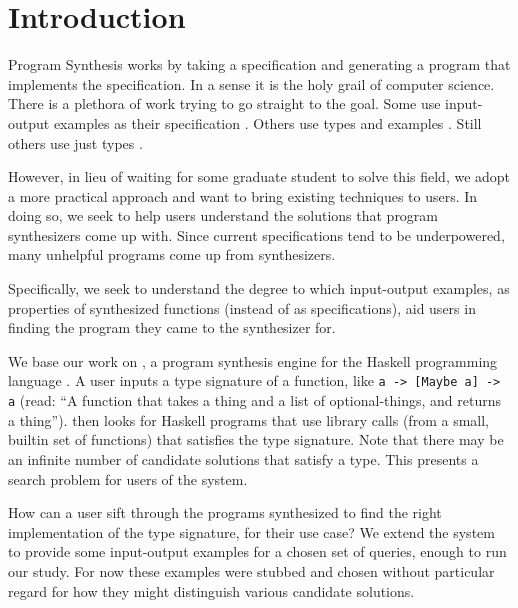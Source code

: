 \section{Introduction}

Program Synthesis works by taking a specification and generating a program that
implements the specification.
%
In a sense it is the holy grail of computer science.
%
There is a plethora of work trying to go straight to the goal.
%
Some use input-output examples as their specification
\cite{Feser_Chaudhuri_Dillig_2015}.
%
Others use types and examples \cite{Osera_Zdancewic_2015}.
%
Still others use just types \cite{hoogle_plus_2020}.

However, in lieu of waiting for some graduate student to solve this field, we
adopt a more practical approach and want to bring existing techniques to users.
%
In doing so, we seek to help users understand the solutions that program
synthesizers come up with.
%
Since current specifications tend to be underpowered, many unhelpful programs
come up from synthesizers.
%

Specifically, we seek to understand the degree to which input-output examples,
as properties of synthesized functions (instead of as specifications), aid users
in finding the program they came to the synthesizer for.


We base our work on \hoogleplus, a program synthesis engine for the
Haskell programming language \cite{hoogle_plus_2020}.
%
A user inputs a type signature of a function, like \texttt{a -> [Maybe a] -> a}
(read: ``A function that takes a thing and a list of optional-things, and
returns a thing'').
%
\hoogleplus then looks for Haskell programs that use library calls (from
a small, builtin set of functions) that satisfies the type signature.
%
Note that there may be an infinite number of candidate solutions that satisfy a type.
%
This presents a search problem for users of the system.

How can a user sift through the programs synthesized to find the right
implementation of the type signature, for their use case?
%
We extend the system to provide some input-output examples for a chosen set of
queries, enough to run our study.
%
For now these examples were stubbed and chosen without particular regard for how
they might distinguish various candidate solutions.
%

